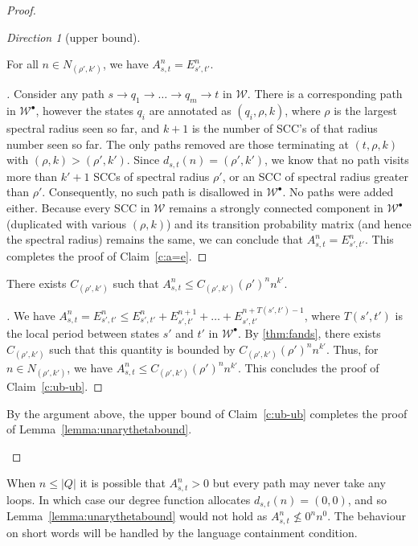 \documentclass[10pt,a4paper]{amsart}
\numberwithin{equation}{section}
\theoremstyle{plain}
\theoremstyle{definition}
\theoremstyle{remark}
\newtheorem{dir}{Direction}
\newenvironment{subproof}[1][\proofname]{\renewcommand{\qedsymbol}{{$\blacksquare$}}\begin{proof}[#1]}{\end{proof}}
\newcommand\period{T}
\newcommand\dgf{d}
\newcommand\wa{\mathcal{W}}
\begin{document}
\begin{proof}
\begin{dir}[upper bound]
\begin{clm}
\label{c:a=e}
For all $n \in N_{(\rho',k')}$, we have $A_{s,t}^n = E_{s',t'}^n$.
\end{clm}

\begin{subproof}
Consider any path $s \to q_1\to\dots \to q_m \to t$ in $\wa$. There is a corresponding path  in $\wa^\bullet$,
however the states $q_i$ are annotated as $(q_i,\rho,k)$, where $\rho$ is the largest spectral radius
seen so far, and $k+1$ is the number of SCC's of that radius number seen so far.
The only paths removed are those terminating at $(t,\rho,k)$ with $(\rho, k) > (\rho',k')$. Since $\dgf_{s,t}(n) = (\rho',k')$, we know that no path visits more than $k'+1$ SCCs of spectral radius $\rho'$, or an SCC of spectral radius greater than $\rho'$. Consequently,  no such path is disallowed in $\wa^\bullet$. No paths were added either.
Because every SCC in $\wa$ remains a strongly connected component in $\wa^\bullet$ (duplicated with various $(\rho, k)$)
and its transition probability matrix (and hence the spectral radius) remains the same, we can conclude that
$A_{s,t}^n = E_{s',t'}^n$.
This completes the proof of Claim~\ref{c:a=e}.
\end{subproof}

\begin{clm}
\label{c:ub-ub}
There exists $C_{(\rho',k')}$ such that  $A_{s,t}^n \le C_{(\rho',k')} (\rho')^n n^{k'}$.
\end{clm}

\begin{subproof}
We have  $A_{s,t}^n = E_{s',t'}^n \le E_{s',t'}^n + E_{s',t'}^{n+1} + \dots + E_{s',t'}^{n+\period(s',t')-1}$, where $\period(s',t')$ is the local period between states $s'$ and $t'$ in $\wa^\bullet$.
By \cref{thm:fands}, there exists $C_{(\rho',k')}$ such that this quantity is bounded by $C_{(\rho',k')} (\rho')^n n^{k'}$.
Thus, for $n \in N_{(\rho',k')}$, we have $A_{s,t}^n \le C_{(\rho',k')} (\rho')^n n^{k'}$.
This concludes the proof of Claim~\ref{c:ub-ub}.
\end{subproof}

\noindent
By the argument above, the upper bound of Claim~\ref{c:ub-ub}
completes the proof of Lemma~\ref{lemma:unarythetabound}.\qedhere
\end{dir}
\end{proof}

\pagebreak

\begin{rem}\label{rem:whynowork}
When $n \le|Q|$ it is possible that $A^n_{s,t} > 0$ but every path may never take any loops. In which case our degree function allocates $d_{s,t}(n) = (0,0)$, and so Lemma~\ref{lemma:unarythetabound} would not hold as $A^n_{s,t} \not\le 0^nn^0$. The behaviour on short words will be handled by the language containment condition.
\end{rem}
\end{document}
